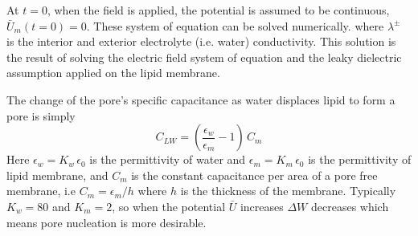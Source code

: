 \documentclass[english,12pt]{article}
\begin{document}
At $t=0$, when the field is applied, the potential is assumed to be continuous, $\bar{U}_m(t=0)=0$. These system of equation can be solved numerically.
where $\lambda^{\pm}$ is the interior and exterior electrolyte (i.e. water) conductivity. This solution is the result of solving the electric field system of equation and the leaky dielectric assumption applied on the lipid membrane.

The change of the pore's specific capacitance as water displaces lipid to form a pore is simply 
\begin{equation}
C_{LW}=\left(\frac{\epsilon_w}{\epsilon_m}-1\right)\,C_m
\end{equation}
Here $\epsilon_w=K_w\,\epsilon_0$ is the permittivity of water and $\epsilon_m=K_m\,\epsilon_0$ is the permittivity of lipid membrane, and $C_m$ is the constant capacitance per area of a pore free membrane, i.e $C_m=\epsilon_m/h$ where $h$ is the thickness of the membrane. Typically $K_w=80$ and $K_m=2$, so when the potential $\bar{U}$ increases $\Delta W$ decreases which means pore nucleation is more desirable.

\end{document}
